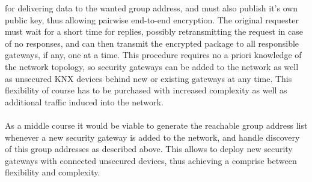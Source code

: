 for delivering data to the wanted group address, and must also publish it's own public key, thus allowing pairwise end-to-end encryption.
The original requester must wait for a short time for replies, possibly retransmitting the request in case
of no responses, and can then transmit the encrypted package to all responsible gateways, if any, one at a time. This procedure requires no a priori knowledge of
the network topology, so security gateways can be added to the network as well as unsecured KNX devices behind new or existing gateways at any time. This
flexibility of course has to be purchased with increased complexity as well as additional traffic induced into the network.
\\
\\
As a middle course it would be viable to generate the reachable group address list whenever a new security gateway is added to the network,
and handle discovery of this group addresses as described
above. This allows to deploy new security gateways with connected unsecured devices, thus achieving a comprise between flexibility and complexity.


